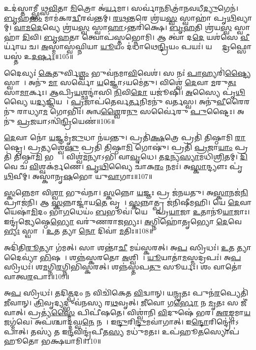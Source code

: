 𑌉𑌦॑𑌸𑍍𑌤𑌾𑌮𑍍𑌫𑍍𑌸𑍀𑌥𑍍𑌸\ul{𑌵𑌿}𑌤𑌾 \ul{𑌮𑌿}𑌤𑍍𑌰𑍋 𑌅॑\ul{𑌰𑍍𑌯}𑌮𑌾।
𑌸𑌰𑍍𑌵𑌾॑\ul{𑌨}𑌮𑌿𑌤𑍍𑌰𑌾॑𑌨\-𑌵𑌧𑍀\ul{𑌦𑍍𑌯𑍁}𑌗𑍇𑌨॑।
\ul{𑌬𑍃}𑌹\ul{𑌨𑍍𑌤𑌂} 𑌮𑌾𑌮॑𑌕𑌰\ul{𑌦𑍍𑌵𑍀}𑌰𑌵॑𑌨𑍍𑌤𑌮𑍍।
\ul{𑌰}\ul{𑌥}\ul{𑌨𑍍𑌤}𑌰𑍇 𑌶𑍍𑌰॑𑌯\ul{𑌸𑍍𑌵} 𑌸𑍍𑌵𑌾𑌹𑌾॑ 𑌪𑍃\ul{𑌥𑌿}𑌵𑍍𑌯𑌾𑌮𑍍।
\ul{𑌵𑌾}\ul{𑌮}\ul{𑌦𑍇}𑌵𑍍𑌯𑍇 𑌶𑍍𑌰॑𑌯\ul{𑌸𑍍𑌵} 𑌸𑍍𑌵𑌾\ul{𑌹𑌾}\-𑌽𑌨𑍍𑌤𑌰𑌿॑𑌕𑍍𑌷𑍇।
\ul{𑌬𑍃}\ul{𑌹}𑌤𑌿 𑌶𑍍𑌰॑𑌯\ul{𑌸𑍍𑌵} 𑌸𑍍𑌵𑌾𑌹𑌾॑ \ul{𑌦𑌿}𑌵𑌿।
\ul{𑌬𑍃}\ul{𑌹}𑌤𑌾 𑌤𑍍𑌵𑍋𑌪॑𑌸𑍍𑌤𑌭𑍍𑌨𑍋𑌮𑌿।
𑌆 𑌤𑍍𑌵𑌾॑ 𑌦\ul{𑌦𑍇} 𑌯𑌶॑𑌸𑍇 \ul{𑌵𑍀}𑌰𑍍𑌯𑌾॑𑌯 𑌚।
\ul{𑌅}𑌸𑍍𑌮𑌾𑌸𑍍𑌵॑𑌘𑍍𑌨𑌿𑌯𑌾 \ul{𑌯𑍂}𑌯𑌂 𑌦॑𑌧𑌾𑌥𑍇\ul{𑌨𑍍𑌦𑍍𑌰𑌿}𑌯𑌂 𑌪𑌯𑌃॑।
𑌯𑌸𑍍𑌤𑍇᳚ \ul{𑌦𑍍𑌰}𑌫𑍍𑌸𑍋 𑌯𑌸𑍍𑌤॑ 𑌉\ul{𑌦}\ul{𑌰𑍍}𑌷𑌃॥105॥

𑌦𑍈𑌵𑍍𑌯𑌃॑ \ul{𑌕𑍇}𑌤𑍁𑌰𑍍𑌵𑌿\ul{𑌶𑍍𑌵𑌂} 𑌭𑍁𑌵॑𑌨𑌮𑌾\ul{𑌵𑌿}𑌵𑍇𑌶॑।
𑌸 𑌨𑌃॑ \ul{𑌪𑌾}𑌹𑍍𑌯𑌰𑌿॑\ul{𑌷𑍍𑌟𑍍𑌯𑍈} 𑌸𑍍𑌵𑌾𑌹𑌾᳚।
𑌅𑌨𑍁॑ \ul{𑌮𑌾} 𑌸𑌰𑍍𑌵𑍋॑ \ul{𑌯}𑌜𑍍𑌞𑍋॑\-𑌽𑌯𑌮𑍇॑𑌤𑍁।
𑌵𑌿𑌶𑍍𑌵𑍇॑ \ul{𑌦𑍇}𑌵𑌾 \ul{𑌮}𑌰𑍁\ul{𑌤𑌃} 𑌸𑌾\ul{𑌮𑌾}𑌰𑍍𑌕𑌃।
\ul{𑌆}𑌪𑍍𑌰𑌿\ul{𑌯}𑌶𑍍𑌛𑌨𑍍𑌦𑌾॑𑌸𑌿 \ul{𑌨𑌿}𑌵𑌿\ul{𑌦𑍋} 𑌯𑌜𑍂॑𑌷𑌿।
\ul{𑌅}𑌸𑍍𑌯𑍈 𑌪𑍃॑\ul{𑌥𑌿}𑌵𑍍𑌯𑍈 𑌯\ul{𑌦𑍍𑌯}𑌜𑍍𑌞𑌿𑌯𑌮𑍍᳚।
\ul{𑌪𑍍𑌰}𑌜𑌾𑌪॑𑌤𑍇𑌰𑍍𑌵\ul{𑌰𑍍𑌤}𑌨𑌿𑌮𑌨𑍁॑ 𑌵𑌰𑍍𑌤𑌸𑍍𑌵।
𑌅𑌨𑍁॑\ul{𑌵𑍀}𑌰𑍈𑌰𑌨𑍁॑ 𑌰𑌾𑌧𑍍𑌯𑌾\ul{𑌮} 𑌗𑍋𑌭𑌿𑌃॑।
𑌅𑌨𑍍𑌵\ul{𑌶𑍍𑌵𑍈}𑌰\ul{𑌨𑍁} 𑌸𑌰𑍍𑌵𑍈॑𑌰𑍁 \ul{𑌪𑍁}𑌷𑍍𑌟𑍈𑌃।
𑌅𑌨𑍁॑ \ul{𑌪𑍍𑌰}𑌜𑌯𑌾\-𑌽𑌨𑍍𑌵𑌿॑\ul{𑌨𑍍𑌦𑍍𑌰𑌿}𑌯𑍇𑌣॑॥106॥

\ul{𑌦𑍇}𑌵𑌾 𑌨𑍋॑ \ul{𑌯}𑌜𑍍𑌞𑌮𑍃॑\ul{𑌜𑍁}𑌧𑌾 𑌨॑𑌯𑌨𑍍𑌤𑍁।
𑌪𑍍𑌰𑌤𑌿॑\-\ul{𑌕𑍍𑌷}𑌤𑍍𑌰𑍇 𑌪𑍍𑌰𑌤𑌿॑ 𑌤𑌿𑌷𑍍𑌠𑌾𑌮𑌿 \ul{𑌰𑌾}𑌷𑍍𑌟𑍍𑌰𑍇।
𑌪𑍍𑌰𑌤𑍍𑌯𑌶𑍍𑌵𑍇॑\ul{𑌷𑍁} 𑌪𑍍𑌰𑌤𑌿॑ 𑌤𑌿𑌷𑍍𑌠𑌾\ul{𑌮𑌿} 𑌗𑍋𑌷𑍁॑।
𑌪𑍍𑌰𑌤𑌿॑ \ul{𑌪𑍍𑌰}𑌜𑌾\ul{𑌯𑌾𑌂} 𑌪𑍍𑌰𑌤𑌿॑ 𑌤𑌿𑌷𑍍𑌠𑌾\ul{𑌮𑌿} 𑌭𑌵𑍍𑌯𑍇᳚।
𑌵𑌿𑌶𑍍𑌵॑\ul{𑌮}𑌨𑍍𑌯𑌾𑌽𑌭𑌿॑ 𑌵𑌾\ul{𑌵𑍃}𑌧𑍇।
𑌤\ul{𑌦}𑌨𑍍𑌯\ul{𑌸𑍍𑌯𑌾}𑌮𑌧𑌿॑\ul{𑌶𑍍𑌰𑌿}𑌤𑌮𑍍।
\ul{𑌦𑌿}𑌵𑍇 𑌚॑ \ul{𑌵𑌿}𑌶𑍍𑌵𑌕॑𑌰𑍍𑌮𑌣𑍇।
\ul{𑌪𑍃}\ul{𑌥𑌿}𑌵𑍍𑌯𑍈 𑌚𑌾॑𑌕\ul{𑌰𑌂} 𑌨𑌮𑌃॑।
𑌅\ul{𑌸𑍍𑌕𑌾}𑌨𑍍𑌦𑍍𑌯𑍗𑌃 𑌪𑍃॑\ul{𑌥𑌿}𑌵𑍀𑌮𑍍।
𑌅𑌸𑍍𑌕𑌾॑𑌨𑍃\ul{𑌷}𑌭𑍋 𑌯𑍁\ul{𑌵𑌾}𑌗𑌾𑌃॥107॥

\ul{𑌸𑍍𑌕}𑌨𑍍𑌨𑍇𑌮𑌾 𑌵𑌿\ul{𑌶𑍍𑌵𑌾} 𑌭𑍁𑌵॑𑌨𑌾।
\ul{𑌸𑍍𑌕}𑌨𑍍𑌨𑍋 \ul{𑌯}𑌜𑍍𑌞𑌃 𑌪𑍍𑌰 𑌜॑𑌨𑌯𑌤𑍁।
𑌅\ul{𑌸𑍍𑌕𑌾}𑌨𑌜॑\ul{𑌨𑌿} 𑌪𑍍𑌰𑌾𑌜॑𑌨𑌿।
𑌆 \ul{𑌸𑍍𑌕}𑌨𑍍𑌨𑌾𑌜𑍍𑌜𑌾॑𑌯\ul{𑌤𑍇} 𑌵𑍃𑌷𑌾᳚।
\ul{𑌸𑍍𑌕}𑌨𑍍𑌨𑌾𑌤𑍍𑌪𑍍𑌰 𑌜॑𑌨𑌿𑌷𑍀𑌮𑌹𑌿।
𑌯𑍇 \ul{𑌦𑍇}𑌵𑌾 𑌯𑍇𑌷𑌾॑\ul{𑌮𑌿}𑌦𑌂 𑌭𑌾॑\ul{𑌗}𑌧𑍇𑌯𑌂॑ \ul{𑌬}𑌭𑍂𑌵॑।
𑌯𑍇𑌷𑌾𑌂᳚ 𑌪𑍍𑌰\ul{𑌯𑌾}𑌜𑌾 \ul{𑌉}𑌤𑌾𑌨𑍂॑\ul{𑌯𑌾}𑌜𑌾𑌃।
𑌇𑌨𑍍𑌦𑍍𑌰॑𑌜𑍍𑌯𑍇𑌷𑍍𑌠𑍇\ul{𑌭𑍍𑌯𑍋} 𑌵𑌰𑍁॑𑌣𑌰𑌾𑌜𑌭𑍍𑌯𑌃।
\ul{𑌅}𑌗𑍍𑌨𑌿𑌹𑍋॑𑌤𑍃𑌭𑍍𑌯𑍋 \ul{𑌦𑍇}𑌵𑍇\ul{𑌭𑍍𑌯𑌃} 𑌸𑍍𑌵𑌾𑌹𑌾᳚।
\ul{𑌉}𑌤 𑌤𑍍𑌯𑌾 \ul{𑌨𑍋} 𑌦𑌿𑌵𑌾॑ \ul{𑌮}𑌤𑌿𑌃॥108॥

𑌅𑌦𑌿॑𑌤𑌿\ul{𑌰𑍂}𑌤𑍍𑌯𑌾 𑌗॑𑌮𑌤𑍍।
𑌸𑌾 𑌶𑌨𑍍𑌤𑌾॑\ul{𑌚𑍀} 𑌮𑌯॑𑌸𑍍𑌕𑌰𑌤𑍍।
𑌅\ul{𑌪} 𑌸𑍍𑌰𑌿𑌧𑌃॑।
\ul{𑌉}𑌤 𑌤𑍍𑌯𑌾 𑌦𑍈𑌵𑍍𑌯𑌾॑ \ul{𑌭𑌿}𑌷𑌜𑌾᳚।
𑌶𑌨𑍍𑌨॑𑌸𑍍𑌕𑌰𑌤𑍋 \ul{𑌅}𑌶𑍍𑌵𑌿𑌨𑌾᳚।
\ul{𑌯𑍂}𑌯𑌾𑌤𑌾॑\ul{𑌮}𑌸𑍍𑌮𑌦𑍍𑌰𑌪𑌃॑।
𑌅\ul{𑌪} 𑌸𑍍𑌰𑌿𑌧𑌃॑।
𑌶\ul{𑌮}𑌗𑍍𑌨𑌿\ul{𑌰}𑌗𑍍𑌨𑌿𑌭𑌿॑𑌸𑍍𑌕𑌰𑌤𑍍।
𑌶𑌨𑍍𑌨॑𑌸𑍍𑌤𑌪\ul{𑌤𑍁} 𑌸𑍂𑌰𑍍𑌯𑌃॑।
𑌶𑌂 𑌵𑌾𑌤𑍋॑ 𑌵𑌾𑌤𑍍𑌵\ul{𑌰}𑌪𑌾𑌃॥109॥

𑌅\ul{𑌪} 𑌸𑍍𑌰𑌿𑌧𑌃॑।
𑌤𑌦𑌿\ul{𑌤𑍍𑌪}𑌦𑌂 𑌨 𑌵𑌿𑌚𑌿॑𑌕𑍇𑌤 \ul{𑌵𑌿}𑌦𑍍𑌵𑌾𑌨𑍍।
𑌯\ul{𑌨𑍍𑌮𑍃}𑌤𑌃 𑌪𑍁𑌨॑\ul{𑌰}𑌪𑍍𑌯𑍇𑌤𑌿॑ \ul{𑌜𑍀}𑌵𑌾𑌨𑍍।
\ul{𑌤𑍍𑌰𑌿}𑌵𑍃𑌦𑍍𑌯𑌦𑍍𑌭𑍁𑌵॑𑌨𑌸𑍍𑌯 𑌰\ul{𑌥}𑌵𑍃𑌤𑍍।
\ul{𑌜𑍀}𑌵𑍋 𑌗\ul{𑌰𑍍𑌭𑍋} 𑌨 \ul{𑌮𑍃}𑌤𑌃 𑌸 𑌜𑍀॑𑌵𑌾𑌤𑍍।
𑌪𑍍𑌰𑌤𑍍𑌯॑\ul{𑌸𑍍𑌮𑍈} 𑌪𑌿𑌪𑍀॑𑌷𑌤𑍇।
𑌵𑌿𑌶𑍍𑌵𑌾॑𑌨𑌿 \ul{𑌵𑌿}𑌦𑍁𑌷𑍇॑ 𑌭𑌰।
\ul{𑌅}\ul{𑌰}\ul{𑌙𑍍𑌗}𑌮𑌾\ul{𑌯} 𑌜𑌗𑍍𑌮॑𑌵𑍇।
𑌅𑌪॑𑌶𑍍𑌚𑌾𑌦𑍍𑌦𑌘𑍍𑌵\ul{𑌨𑍇} 𑌨𑌰𑍇᳚।
𑌇\ul{𑌨𑍍𑌦𑍁}𑌰𑌿\ul{𑌨𑍍𑌦𑍁}𑌮𑌵𑌾॑𑌗𑌾𑌤𑍍।
𑌇\ul{𑌨𑍍𑌦𑍋}𑌰𑌿𑌨𑍍𑌦𑍍𑌰𑍋॑\-𑌽𑌪𑌾𑌤𑍍।
𑌤𑌸𑍍𑌯॑ 𑌤 𑌇\ul{𑌨𑍍𑌦}𑌵𑌿𑌨𑍍𑌦𑍍𑌰॑𑌪𑍀𑌤\ul{𑌸𑍍𑌯} 𑌮𑌧𑍁॑𑌮𑌤𑌃।
𑌉𑌪॑𑌹𑍂\ul{𑌤}𑌸𑍍𑌯𑍋𑌪॑𑌹𑍂𑌤𑍋 𑌭𑌕𑍍𑌷𑌯𑌾𑌮𑌿॥110॥\anuvakamend[\ul{𑌉}\ul{𑌦}\ul{𑌰𑍍}𑌷 𑌇॑\ul{𑌨𑍍𑌦𑍍𑌰𑌿}𑌯𑍇\ul{𑌣} 𑌗𑌾 \ul{𑌮}𑌤𑌿𑌰॑\ul{𑌰}𑌪𑌾 𑌅॑\ul{𑌗𑌾}𑌤𑍍𑌰𑍀𑌣𑌿॑ 𑌚]

